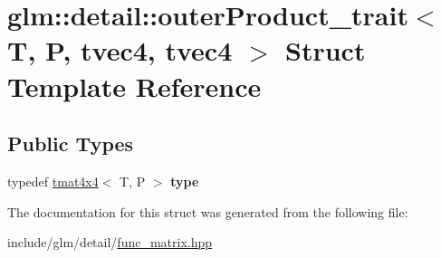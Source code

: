 \hypertarget{structglm_1_1detail_1_1outerProduct__trait_3_01T_00_01P_00_01tvec4_00_01tvec4_01_4}{}\section{glm\+:\+:detail\+:\+:outer\+Product\+\_\+trait$<$ T, P, tvec4, tvec4 $>$ Struct Template Reference}
\label{structglm_1_1detail_1_1outerProduct__trait_3_01T_00_01P_00_01tvec4_00_01tvec4_01_4}
\subsection*{Public Types}
\begin{DoxyCompactItemize}
\item 
\mbox{\label{structglm_1_1detail_1_1outerProduct__trait_3_01T_00_01P_00_01tvec4_00_01tvec4_01_4_a89f0d2b33be6604293d1373176291811}} 
typedef \hyperlink{structglm_1_1tmat4x4}{tmat4x4}$<$ T, P $>$ {\bfseries type}
\end{DoxyCompactItemize}


The documentation for this struct was generated from the following file\+:\begin{DoxyCompactItemize}
\item 
include/glm/detail/\hyperlink{func__matrix_8hpp}{func\+\_\+matrix.\+hpp}\end{DoxyCompactItemize}
